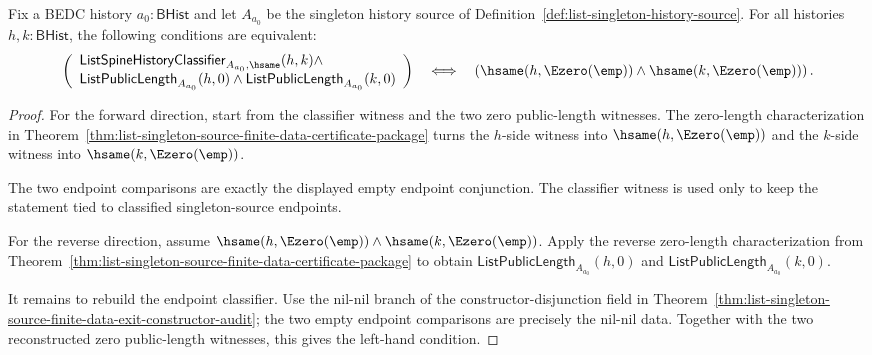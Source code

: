 \begin{theorem}
\label{thm:list-singleton-source-classified-zero-length-iff-empty}
Fix a BEDC history $a_0:\mathsf{BHist}$ and let $A_{a_0}$ be the singleton
history source of Definition~\ref{def:list-singleton-history-source}. For all
histories $h,k:\mathsf{BHist}$, the following conditions are equivalent:
$$
\left(
\begin{array}{l}
\mathsf{ListSpineHistoryClassifier}_{A_{a_0},\hsame}(h,k)\land\\
\mathsf{ListPublicLength}_{A_{a_0}}(h,0)\land
\mathsf{ListPublicLength}_{A_{a_0}}(k,0)
\end{array}
\right)
\quad\Longleftrightarrow\quad
\left(\hsame(h,\Ezero(\emp))\land \hsame(k,\Ezero(\emp))\right).
$$
\end{theorem}
\begin{proof}
For the forward direction, start from the classifier witness and the two
zero public-length witnesses. The zero-length characterization in
Theorem~\ref{thm:list-singleton-source-finite-data-certificate-package} turns the
$h$-side witness into $\hsame(h,\Ezero(\emp))$ and the $k$-side witness into
$\hsame(k,\Ezero(\emp))$.

The two endpoint comparisons are exactly the displayed empty endpoint
conjunction. The classifier witness is used only to keep the statement tied to
classified singleton-source endpoints.

For the reverse direction, assume
$\hsame(h,\Ezero(\emp))\land\hsame(k,\Ezero(\emp))$. Apply the
reverse zero-length characterization from
Theorem~\ref{thm:list-singleton-source-finite-data-certificate-package} to obtain
$\mathsf{ListPublicLength}_{A_{a_0}}(h,0)$ and
$\mathsf{ListPublicLength}_{A_{a_0}}(k,0)$.

It remains to rebuild the endpoint classifier. Use the nil-nil branch of the
constructor-disjunction field in
Theorem~\ref{thm:list-singleton-source-finite-data-exit-constructor-audit}; the
two empty endpoint comparisons are precisely the nil-nil data. Together with the
two reconstructed zero public-length witnesses, this gives the left-hand
condition.
\end{proof}

